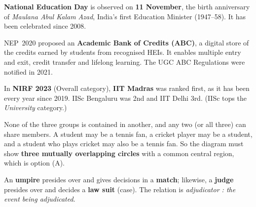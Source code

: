 \textbf{National Education Day} is observed on \textbf{11 November}, the birth anniversary of \emph{Maulana Abul Kalam Azad}, India's first Education Minister (1947--58). It has been celebrated since 2008.

NEP~2020 proposed an \textbf{Academic Bank of Credits (ABC)}, a digital store of the credits earned by students from recognised HEIs. It enables multiple entry and exit, credit transfer and lifelong learning. The UGC ABC Regulations were notified in 2021.

In \textbf{NIRF 2023} (Overall category), \textbf{IIT Madras} was ranked first, as it has been every year since 2019. IISc Bengaluru was 2nd and IIT Delhi 3rd. (IISc tops the \emph{University} category.)


None of the three groups is contained in another, and any two (or all three) can share members. A student may be a tennis fan, a cricket player may be a student, and a student who plays cricket may also be a tennis fan. So the diagram must show \textbf{three mutually overlapping circles} with a common central region, which is option (A).
\begin{center}
\end{center}

An \textbf{umpire} presides over and gives decisions in a \textbf{match}; likewise, a \textbf{judge} presides over and decides a \textbf{law suit} (case). The relation is \emph{adjudicator : the event being adjudicated}.

